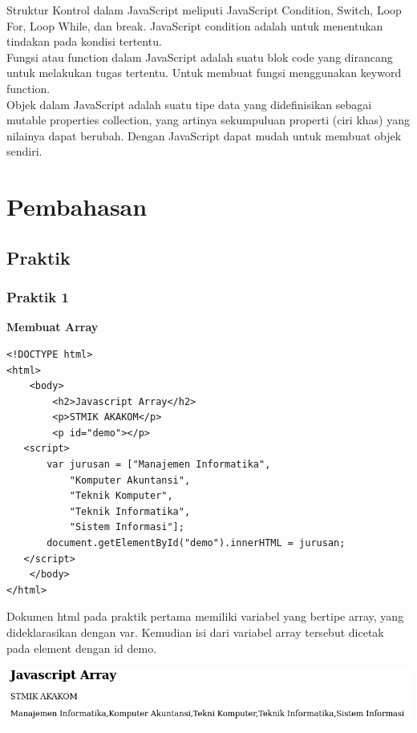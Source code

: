 \documentclass[a4paper,12pt]{article}
\begin{document}
Struktur Kontrol dalam JavaScript meliputi JavaScript Condition, Switch, Loop
For, Loop While, dan break. JavaScript condition adalah untuk menentukan
tindakan pada kondisi tertentu.\\

Fungsi atau function dalam JavaScript adalah suatu blok code yang dirancang
untuk melakukan tugas tertentu. Untuk membuat fungsi menggunakan keyword
function.\\

Objek dalam JavaScript adalah suatu tipe data yang didefinisikan sebagai
mutable properties collection, yang artinya sekumpuluan properti (ciri khas) yang
nilainya dapat berubah. Dengan JavaScript dapat mudah untuk membuat objek
sendiri.\\
\newpage

\section{Pembahasan}
\subsection{Praktik}
\subsubsection{Praktik 1}
\textbf{Membuat Array\\}
\begin{lstlisting}[style=htmlcssjs]
<!DOCTYPE html>
<html>
    <body>
        <h2>Javascript Array</h2>
        <p>STMIK AKAKOM</p>
        <p id="demo"></p>
   <script>
       var jurusan = ["Manajemen Informatika",
           "Komputer Akuntansi",
           "Teknik Komputer",
           "Teknik Informatika",
           "Sistem Informasi"];
       document.getElementById("demo").innerHTML = jurusan;
   </script>
    </body>
</html>
\end{lstlisting}
Dokumen html pada praktik pertama memiliki variabel yang bertipe array, yang dideklarasikan dengan var. Kemudian isi
dari variabel array tersebut dicetak pada element dengan id demo.
\begin{center}
    \includegraphics[scale=.7]{1.png} 
\end{center}
\end{document}
